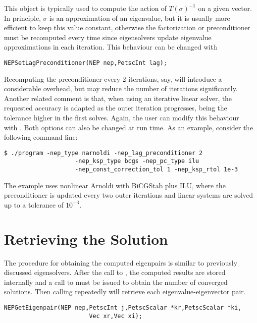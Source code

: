This  object is typically used to compute the action of $T(\sigma)^{-1}$ on a given vector. In principle, $\sigma$ is an approximation of an eigenvalue, but it is usually more efficient to keep this value constant, otherwise the factorization or preconditioner must be recomputed every time since eigensolvers update eigenvalue approximations in each iteration. This behaviour can be changed with
	\begin{Verbatim}[fontsize=\small]
	NEPSetLagPreconditioner(NEP nep,PetscInt lag);
	\end{Verbatim}
Recomputing the preconditioner every 2 iterations, say, will introduce a considerable overhead, but may reduce the number of iterations significantly. Another related comment is that, when using an iterative linear solver, the requested accuracy is adapted as the outer iteration progresses, being the tolerance higher in the first solves. Again, the user can modify this behaviour with . Both options can also be changed at run time. As an example, consider the following command line:
\begin{Verbatim}[fontsize=\small]
	$ ./program -nep_type narnoldi -nep_lag_preconditioner 2
                    -nep_ksp_type bcgs -nep_pc_type ilu
                    -nep_const_correction_tol 1 -nep_ksp_rtol 1e-3
\end{Verbatim}
The example uses nonlinear Arnoldi with BiCGStab plus ILU, where the preconditioner is updated every two outer iterations and linear systems are solved up to a tolerance of $10^{-3}$.

\section{Retrieving the Solution}

The procedure for obtaining the computed eigenpairs is similar to previously discussed eigensolvers. After the call to , the computed results are stored internally and a call to  must be issued to obtain the number of converged solutions. Then calling  repeatedly will retrieve each eigenvalue-eigenvector pair.

	\begin{Verbatim}[fontsize=\small]
	NEPGetEigenpair(NEP nep,PetscInt j,PetscScalar *kr,PetscScalar *ki,
                        Vec xr,Vec xi);
	\end{Verbatim}

